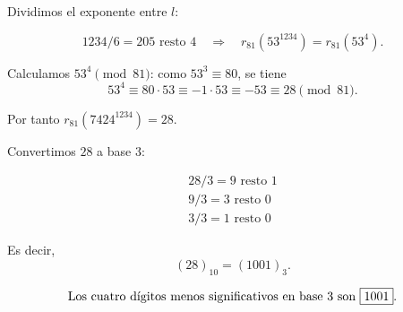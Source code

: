 \documentclass[a4paper,12pt]{article}
\begin{document}
\begin{ejercicio}[title=Ejercicio 30]
Dividimos el exponente entre $l$:

\[
1234 / 6 = 205 \text{ resto } 4 \quad \Rightarrow \quad r_{81}(53^{1234}) = r_{81}(53^4).
\]

Calculamos $53^4 \pmod{81}$: como $53^3 \equiv 80$, se tiene
\[
53^4 \equiv 80\cdot 53 \equiv -1\cdot 53 \equiv -53 \equiv 28 \pmod{81}.
\]

Por tanto $r_{81}(7424^{1234}) = 28$.

Convertimos $28$ a base $3$:

\[
\begin{aligned}
    28 / 3 = 9 \text{ resto } 1 \\
9 / 3 = 3 \text{ resto } 0 \\
3 / 3 = 1 \text{ resto } 0
\end{aligned}
\]

Es decir,
\[
(28)_{10} = (1001)_3.
\]

\[
\text{Los cuatro dígitos menos significativos en base 3 son \boxed{1001}}.
\]
\end{ejercicio}
\end{document}
